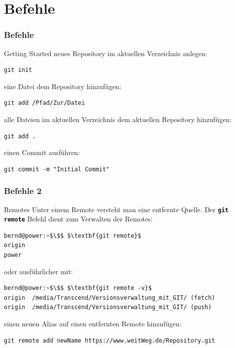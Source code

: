 \documentclass{beamer}
\begin{document}
\section{Befehle}

\begin{frame}[fragile]\frametitle{Befehle}
\begin{block} {Getting Started}
neues Repository im aktuellen Verzeichnis anlegen:
\begin{lstlisting}
git init
\end{lstlisting}
%

eine Datei dem Repository hinzufügen:
\begin{lstlisting}
git add /Pfad/Zur/Datei
\end{lstlisting}

alle Dateien im aktuellen Verzeichnis dem aktuellen Repository hinzufügen:
\begin{lstlisting}
git add .
\end{lstlisting}

einen Commit ausführen:
\begin{lstlisting}
git commit -m "Initial Commit"
\end{lstlisting}
\end{block}
\end{frame}

\begin{frame}[fragile]\frametitle{Befehle 2}
\begin{block} {Remotes}
Unter einem Remote versteht man eine entfernte Quelle. Der \textbf{\lstinline|git remote|} Befehl dient zum Verwalten der Remotes:
\begin{lstlisting}[mathescape=true]
bernd@power:~$\$$ $\textbf{git remote}$
origin
power
\end{lstlisting}

oder ausführlicher mit:
\begin{lstlisting}[mathescape=true]
bernd@power:~$\$$ $\textbf{git remote -v}$
origin  /media/Transcend/Versionsverwaltung_mit_GIT/ (fetch)
origin  /media/Transcend/Versionsverwaltung_mit_GIT/ (push)
\end{lstlisting}

einen neuen Alias auf einen entfernten Remote hinzufügen:
\begin{lstlisting}
git remote add newName https://www.weitWeg.de/Repository.git
\end{lstlisting}
\end{block}
\end{frame}
\end{document}
